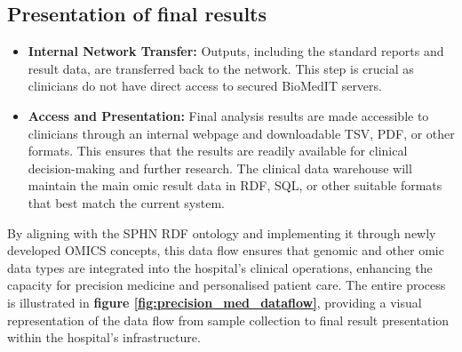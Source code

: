 \subsection{Presentation of final results}
\begin{itemize}
    \item \textbf{Internal Network Transfer:} Outputs, including the standard reports and result data, are transferred back to the \kispi network. This step is crucial as clinicians do not have direct access to secured BioMedIT servers.
    \item \textbf{Access and Presentation:} Final analysis results are made accessible to clinicians through an internal webpage and downloadable TSV, PDF, or other formats. This ensures that the results are readily available for clinical decision-making and further research. The clinical data warehouse will maintain the main omic result data in RDF, SQL, or other suitable formats that best match the current system. 
\end{itemize}

By aligning with the SPHN RDF ontology and implementing it through newly developed OMICS concepts, this data flow ensures that genomic and other omic data types are integrated into the hospital’s clinical operations, enhancing the capacity for precision medicine and personalised patient care.
The entire process is illustrated in 
\textbf{figure \ref{fig:precision_med_dataflow}}, 
providing a visual representation of the data flow from sample collection to final result presentation within the hospital’s infrastructure.



